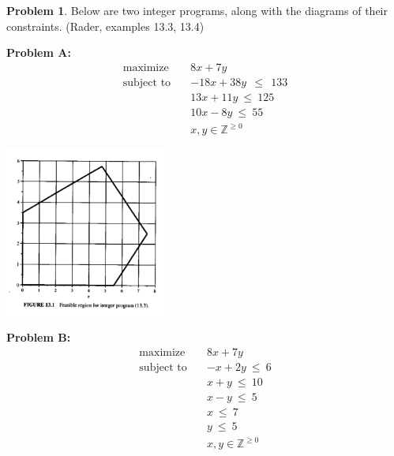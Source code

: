 \documentclass[11pt]{article}
\theoremstyle{definition}
\newtheorem{problem}{Problem}
\newcommand{\answerbox}[3]{%
  \fbox{%
    \begin{minipage}[#1]{#2}
      \hfill\vspace{#3}
    \end{minipage}
  }
}
\newcommand{\wordbox}{\answerbox{c}{1.2in}{.7cm}}
\newcommand{\maximize}{\text{maximize}}
\newcommand{\subjectto}{\text{subject to}}
\begin{document}
%
%
%



\newpage
\begin{problem}  
Below are two integer programs, along with the diagrams of their constraints. (Rader, examples 13.3, 13.4) 

\begin{multicols}{2}

{\bf Problem A:}
\begin{align*}
      \maximize \quad & 8x + 7y \\
      \subjectto \quad & -18x + 38y ~~\leq~~ 133\\
                       & 13x + 11y ~\leq~ 125\\
                       & 10x - 8y ~\leq~ 55\\
                       & x,y \in \mathbb{Z}^{\geq 0}
\end{align*}
\vspace{6cm}

\includegraphics[width = 0.4\textwidth]{formulation_bad}
\end{multicols}

\begin{multicols}{2}

{\bf Problem B:}
\begin{align*}
      \maximize \quad & 8x + 7y \\
      \subjectto \quad & -x+2y ~\leq~ 6\\
                       & x + y ~\leq~ 10\\
                       & x - y ~\leq~ 5\\
                       & x ~\leq~ 7\\
                       & y ~\leq~ 5\\
                       & x,y \in \mathbb{Z}^{\geq 0}
\end{align*}
\vspace{6cm}


\end{multicols}
\end{problem}
\end{document}
